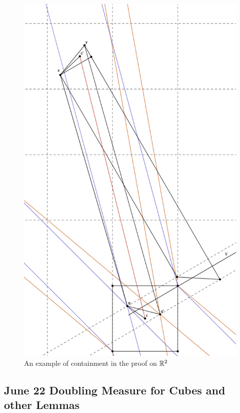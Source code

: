 \begin{figure}[H]
    \centering
    \includegraphics[width=.66\textwidth]{images/guaranteeContainalpha12.png}
    \caption{An example of containment in the proof on $\mathbb{R}^2$}
\end{figure}




\newpage
\subsection{June 22 Doubling Measure for Cubes and other Lemmas}

